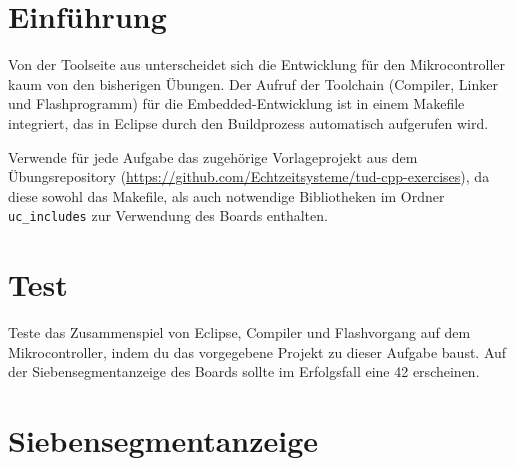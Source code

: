 
\newcommand{\exday}{5}
\cppSetTitle
\setcounter{section}{-1}



\cppSetHeaderAndMakeTitle


\section*{Einführung}
Von der Toolseite aus unterscheidet sich die Entwicklung für den Mikrocontroller kaum von den bisherigen Übungen.
Der Aufruf der Toolchain (Compiler, Linker und Flashprogramm) für die Embedded-Entwicklung ist in einem Makefile integriert, das in Eclipse durch den Buildprozess automatisch aufgerufen wird.

Verwende für jede Aufgabe das zugehörige Vorlageprojekt aus dem Übungsrepository (\url{https://github.com/Echtzeitsysteme/tud-cpp-exercises}), da diese sowohl das Makefile, als auch notwendige Bibliotheken im Ordner \texttt{uc\_includes} zur Verwendung des Boards enthalten.


\section{Test}
Teste das Zusammenspiel von Eclipse, Compiler und Flashvorgang auf dem Mikrocontroller, indem du das vorgegebene Projekt zu dieser Aufgabe baust.
Auf der Siebensegmentanzeige des Boards sollte im Erfolgsfall eine 42 erscheinen.



\section{Siebensegmentanzeige}
\label{exercise7Segment}

